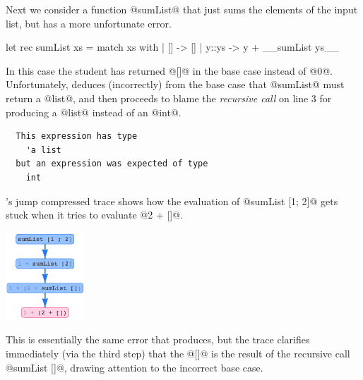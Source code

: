 Next we consider a function @sumList@ that just sums the elements of the
input list, but has a more unfortunate error.
\begin{ecode}
  let rec sumList xs = match xs with
    | []    -> []
    | y::ys -> y + __sumList ys__
\end{ecode}
%
In this case the student has returned @[]@ in the base case instead of
@0@. Unfortunately, \ocaml deduces (incorrectly) from the base case that
@sumList@ must return a @list@, and then proceeds to blame the
\emph{recursive call} on line 3 for producing a @list@ instead of an
@int@.
%
\begin{verbatim}
  This expression has type
    'a list
  but an expression was expected of type
    int
\end{verbatim}
%
\toolname's jump compressed trace shows how the evaluation of
@sumList [1; 2]@ gets stuck when it tries to evaluate @2 + []@.
%
\begin{center}
  \includegraphics[height=125px]{sumlist.png}
\end{center}
%
This is essentially the same error that \ocaml produces, but the trace
clarifies immediately (via the third step) that the @[]@ is the result
of the recursive call @sumList []@, drawing attention to the incorrect
base case.


